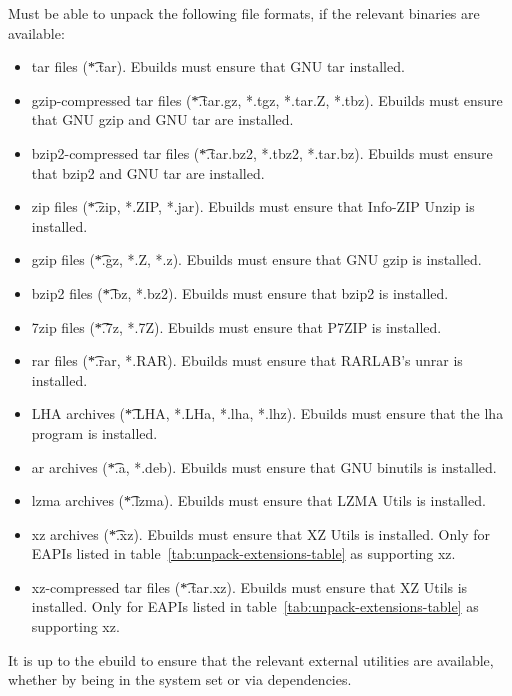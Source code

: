 \begin{description}
     Must be able to unpack the following file formats, if the
    relevant binaries are available:
    \begin{itemize}
    \item tar files (\t{*.tar}). Ebuilds must ensure that GNU tar installed.
    \item gzip-compressed tar files (\t{*.tar.gz, *.tgz, *.tar.Z, *.tbz}). Ebuilds must ensure that
    GNU gzip and GNU tar are installed.
    \item bzip2-compressed tar files (\t{*.tar.bz2, *.tbz2, *.tar.bz}). Ebuilds must ensure that
    bzip2 and GNU tar are installed.
    \item zip files (\t{*.zip, *.ZIP, *.jar}). Ebuilds must ensure that Info-ZIP Unzip is installed.
    \item gzip files (\t{*.gz, *.Z, *.z}). Ebuilds must ensure that GNU gzip is installed.
    \item bzip2 files (\t{*.bz, *.bz2}). Ebuilds must ensure that bzip2 is installed.
    \item 7zip files (\t{*.7z, *.7Z}). Ebuilds must ensure that P7ZIP is installed.
    \item rar files (\t{*.rar, *.RAR}). Ebuilds must ensure that RARLAB's unrar is installed.
    \item LHA archives (\t{*.LHA, *.LHa, *.lha, *.lhz}). Ebuilds must ensure that the lha program is
    installed.
    \item ar archives (\t{*.a, *.deb}). Ebuilds must ensure that GNU binutils is installed.
    \item lzma archives (\t{*.lzma}). Ebuilds must ensure that LZMA Utils is installed.
    \item xz archives (\t{*.xz}). Ebuilds must ensure that XZ Utils is installed. Only for EAPIs
        listed in table~\ref{tab:unpack-extensions-table} as supporting xz.
    \item xz-compressed tar files (\t{*.tar.xz}). Ebuilds must ensure that XZ Utils is installed.
        Only for EAPIs listed in table~\ref{tab:unpack-extensions-table} as supporting xz.
    \end{itemize}
    It is up to the ebuild to ensure that the relevant external utilities are available, whether by
    being in the system set or via dependencies.


\end{description}
